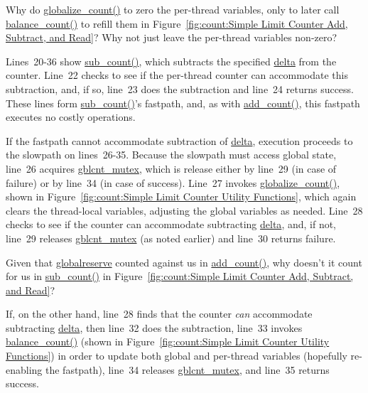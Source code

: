 \QuickQuiz{}
	Why do \url{globalize_count()} to zero the per-thread variables,
	only to later call \url{balance_count()} to refill them in
	Figure~\ref{fig:count:Simple Limit Counter Add, Subtract, and Read}?
	Why not just leave the per-thread variables non-zero?
 \QuickQuizEnd

Lines~20-36 show \url{sub_count()}, which subtracts the specified
\url{delta} from the counter.
Line~22 checks to see if the per-thread counter can accommodate
this subtraction, and, if so, line~23 does the subtraction and
line~24 returns success.
These lines form \url{sub_count()}'s fastpath, and, as with
\url{add_count()}, this fastpath executes no costly operations.

If the fastpath cannot accommodate subtraction of \url{delta},
execution proceeds to the slowpath on lines~26-35.
Because the slowpath must access global state, line~26
acquires \url{gblcnt_mutex}, which is release either by line~29
(in case of failure) or by line~34 (in case of success).
Line~27 invokes \url{globalize_count()}, shown in
Figure~\ref{fig:count:Simple Limit Counter Utility Functions},
which again clears the thread-local variables, adjusting the global variables
as needed.
Line~28 checks to see if the counter can accommodate subtracting
\url{delta}, and, if not, line~29 releases \url{gblcnt_mutex}
(as noted earlier) and line~30 returns failure.

\QuickQuiz{}
	Given that \url{globalreserve} counted against us in \url{add_count()},
	why doesn't it count for us in \url{sub_count()} in
	Figure~\ref{fig:count:Simple Limit Counter Add, Subtract, and Read}?
 \QuickQuizEnd

If, on the other hand, line~28 finds that the counter \emph{can}
accommodate subtracting \url{delta}, then line~32 does the subtraction,
line~33 invokes \url{balance_count()} (shown in
Figure~\ref{fig:count:Simple Limit Counter Utility Functions})
in order to update both global and per-thread variables
(hopefully re-enabling the fastpath),
line~34 releases \url{gblcnt_mutex}, and line~35 returns success.

